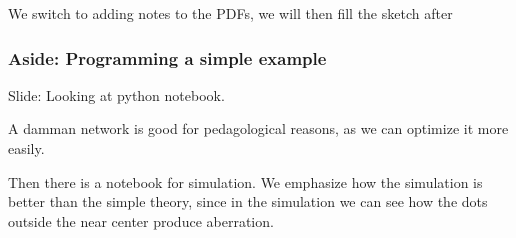 \documentclass[../main/main.tex]{subfiles}
\begin{document}
We switch to adding notes to the PDFs, we will then fill the sketch after



















\subsubsection{Aside: Programming a simple example}

Slide: Looking at python notebook.

A damman network is good for pedagological reasons, as we can optimize it more easily.


Then there is a notebook for simulation. We emphasize how the simulation is better than the simple theory, since in the simulation we can see how the dots outside the near center produce aberration.

\end{document}
